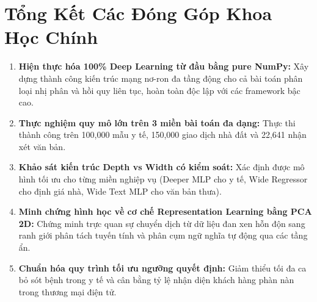\documentclass[12pt,a4paper]{report}
\begin{document}
\section{Tổng Kết Các Đóng Góp Khoa Học Chính}
\begin{enumerate}
    \item \textbf{Hiện thực hóa 100\% Deep Learning từ đầu bằng pure NumPy:} Xây dựng thành công kiến trúc mạng nơ-ron đa tầng động cho cả bài toán phân loại nhị phân và hồi quy liên tục, hoàn toàn độc lập với các framework bậc cao.
    \item \textbf{Thực nghiệm quy mô lớn trên 3 miền bài toán đa dạng:} Thực thi thành công trên 100,000 mẫu y tế, 150,000 giao dịch nhà đất và 22,641 nhận xét văn bản.
    \item \textbf{Khảo sát kiến trúc Depth vs Width có kiểm soát:} Xác định được mô hình tối ưu cho từng miền nghiệp vụ (Deeper MLP cho y tế, Wide Regressor cho định giá nhà, Wide Text MLP cho văn bản thưa).
    \item \textbf{Minh chứng hình học về cơ chế Representation Learning bằng PCA 2D:} Chứng minh trực quan sự chuyển dịch từ dữ liệu đan xen hỗn độn sang ranh giới phân tách tuyến tính và phân cụm ngữ nghĩa tự động qua các tầng ẩn.
    \item \textbf{Chuẩn hóa quy trình tối ưu ngưỡng quyết định:} Giảm thiểu tối đa ca bỏ sót bệnh trong y tế và cân bằng tỷ lệ nhận diện khách hàng phàn nàn trong thương mại điện tử.
\end{enumerate}
\end{document}

